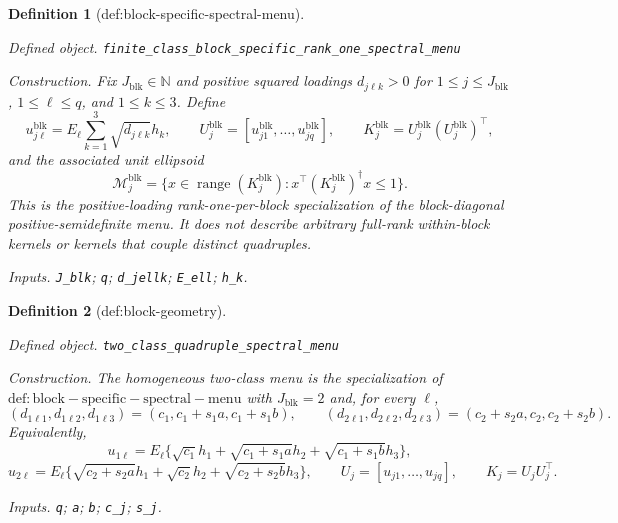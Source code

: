 \documentclass{article}
\newtheorem{definition}{Definition}
\begin{document}
\begin{definition}[def:block-specific-spectral-menu]\label{def:block-specific-spectral-menu}
\par\smallskip\noindent\emph{Defined object.} \texttt{finite\_\allowbreak{}class\_\allowbreak{}block\_\allowbreak{}specific\_\allowbreak{}rank\_\allowbreak{}one\_\allowbreak{}spectral\_\allowbreak{}menu}
\par\smallskip\noindent\emph{Construction.} Fix \(J_{\mathrm{blk}}\in\mathbb N\) and positive squared loadings \(d_{j\ell k}>0\) for \(1\le j\le J_{\mathrm{blk}}\), \(1\le\ell\le q\), and \(1\le k\le3\). Define
\[
u^{\mathrm{blk}}_{j\ell}
=E_\ell\sum_{k=1}^3\sqrt{d_{j\ell k}}h_k,
\qquad
U_j^{\mathrm{blk}}=[u^{\mathrm{blk}}_{j1},\ldots,u^{\mathrm{blk}}_{jq}],
\qquad
K_j^{\mathrm{blk}}=U_j^{\mathrm{blk}}(U_j^{\mathrm{blk}})^\top,
\]
and the associated unit ellipsoid
\[
\mathcal M_j^{\mathrm{blk}}
=\{x\in\operatorname{range}(K_j^{\mathrm{blk}}):
x^\top(K_j^{\mathrm{blk}})^\dagger x\le1\}.
\]
This is the positive-loading rank-one-per-block specialization of the block-diagonal positive-semidefinite menu.  It does not describe arbitrary full-rank within-block kernels or kernels that couple distinct quadruples.
\par\smallskip\noindent\emph{Inputs.} \texttt{J\_\allowbreak{}blk}; \texttt{q}; \texttt{d\_\allowbreak{}jellk}; \texttt{E\_\allowbreak{}ell}; \texttt{h\_\allowbreak{}k}.
\end{definition}

\begin{definition}[def:block-geometry]\label{def:block-geometry}
\par\smallskip\noindent\emph{Defined object.} \texttt{two\_\allowbreak{}class\_\allowbreak{}quadruple\_\allowbreak{}spectral\_\allowbreak{}menu}
\par\smallskip\noindent\emph{Construction.} The homogeneous two-class menu is the specialization of \(\mathrm{def:block-specific-spectral-menu}\) with \(J_{\mathrm{blk}}=2\) and, for every \(\ell\),
\[
(d_{1\ell1},d_{1\ell2},d_{1\ell3})
=(c_1,c_1+s_1a,c_1+s_1b),
\qquad
(d_{2\ell1},d_{2\ell2},d_{2\ell3})
=(c_2+s_2a,c_2,c_2+s_2b).
\]
Equivalently,
\[
u_{1\ell}=E_\ell\{\sqrt{c_1}h_1+\sqrt{c_1+s_1a}h_2+\sqrt{c_1+s_1b}h_3\},
\]
\[
u_{2\ell}=E_\ell\{\sqrt{c_2+s_2a}h_1+\sqrt{c_2}h_2+\sqrt{c_2+s_2b}h_3\},
\qquad
U_j=[u_{j1},\ldots,u_{jq}],
\qquad
K_j=U_jU_j^\top.
\]
\par\smallskip\noindent\emph{Inputs.} \texttt{q}; \texttt{a}; \texttt{b}; \texttt{c\_\allowbreak{}j}; \texttt{s\_\allowbreak{}j}.
\end{definition}
\end{document}
